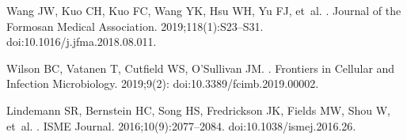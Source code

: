 \documentclass[10pt,letterpaper]{article}
\begin{document}
\begin{thebibliography}{10}
Wang JW, Kuo CH, Kuo FC, Wang YK, Hsu WH, Yu FJ, et~al.
.
\newblock Journal of the Formosan Medical Association. 2019;118(1):S23--S31.
\newblock doi:{10.1016/j.jfma.2018.08.011}.

Wilson BC, Vatanen T, Cutfield WS, O'Sullivan JM.
.
\newblock Frontiers in Cellular and Infection Microbiology. 2019;9(2):
\newblock doi:{10.3389/fcimb.2019.00002}.

Lindemann SR, Bernstein HC, Song HS, Fredrickson JK, Fields MW, Shou W, et~al.
.
\newblock ISME Journal. 2016;10(9):2077--2084.
\newblock doi:{10.1038/ismej.2016.26}.

\end{thebibliography}
\end{document}

